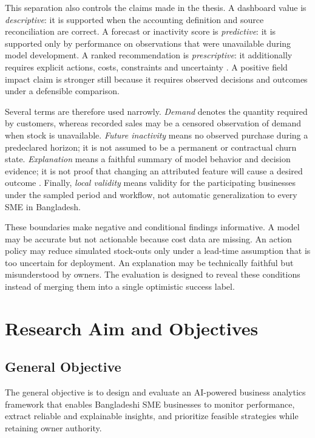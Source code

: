 This separation also controls the claims made in the thesis. A dashboard value
is \emph{descriptive}: it is supported when the accounting definition and
source reconciliation are correct. A forecast or inactivity score is
\emph{predictive}: it is supported only by performance on observations that
were unavailable during model development. A ranked recommendation is
\emph{prescriptive}: it additionally requires explicit actions, costs,
constraints and uncertainty \cite{bertsimas2020prescriptive}. A positive field
impact claim is stronger still because it requires observed decisions and
outcomes under a defensible comparison.

Several terms are therefore used narrowly. \emph{Demand} denotes the quantity
required by customers, whereas recorded sales may be a censored observation of
demand when stock is unavailable. \emph{Future inactivity} means no observed
purchase during a predeclared horizon; it is not assumed to be a permanent or
contractual churn state. \emph{Explanation} means a faithful summary of model
behavior and decision evidence; it is not proof that changing an attributed
feature will cause a desired outcome \cite{lundberg2017shap,miller2019explanation}.
Finally, \emph{local validity} means validity for the participating businesses
under the sampled period and workflow, not automatic generalization to every
SME in Bangladesh.

These boundaries make negative and conditional findings informative. A model
may be accurate but not actionable because cost data are missing. An action
policy may reduce simulated stock-outs only under a lead-time assumption that
is too uncertain for deployment. An explanation may be technically faithful
but misunderstood by owners. The evaluation is designed to reveal these
conditions instead of merging them into a single optimistic success label.

\section{Research Aim and Objectives}

\subsection{General Objective}

The general objective is to design and evaluate an AI-powered business
analytics framework that enables Bangladeshi SME businesses to monitor
performance, extract reliable and explainable insights, and prioritize feasible
strategies while retaining owner authority.


